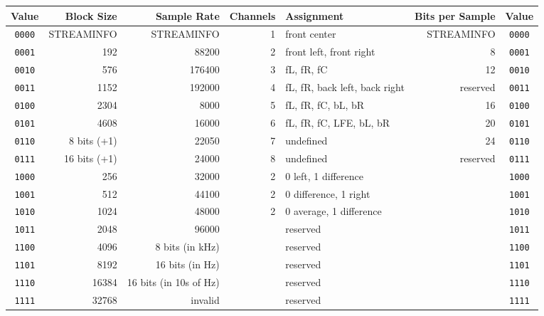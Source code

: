 \label{flac_encoded_fields}
\begin{figure}[h]
\begin{tiny}
\begin{tabular}{|c|r|r|r|l|r|c|}
\hline
Value & Block Size & Sample Rate & Channels & Assignment & Bits per Sample & Value \\
\hline
\texttt{0000} & STREAMINFO & STREAMINFO & 1 & front center & STREAMINFO & \texttt{0000} \\
\texttt{0001} & 192 & 88200 & 2 & front left, front right & 8 & \texttt{0001} \\
\texttt{0010} & 576 & 176400 & 3 & fL, fR, fC & 12 & \texttt{0010} \\
\texttt{0011} & 1152 & 192000 & 4 & fL, fR, back left, back right & reserved & \texttt{0011} \\
\texttt{0100} & 2304 & 8000 & 5 & fL, fR, fC, bL, bR & 16 & \texttt{0100} \\
\texttt{0101} & 4608 & 16000 & 6 & fL, fR, fC, LFE, bL, bR & 20 & \texttt{0101} \\
\texttt{0110} & 8 bits (+1) & 22050 & 7 & undefined & 24 & \texttt{0110} \\
\texttt{0111} & 16 bits (+1) & 24000 & 8 & undefined & reserved & \texttt{0111} \\
\texttt{1000} & 256 & 32000 & 2 & 0 left, 1 difference & & \texttt{1000} \\
\texttt{1001} & 512 & 44100 & 2 & 0 difference, 1 right & & \texttt{1001} \\
\texttt{1010} & 1024 & 48000 & 2 & 0 average, 1 difference & & \texttt{1010} \\
\texttt{1011} & 2048 & 96000 & & reserved & & \texttt{1011} \\
\texttt{1100} & 4096 & 8 bits (in kHz) & & reserved & & \texttt{1100} \\
\texttt{1101} & 8192 & 16 bits (in Hz) & & reserved & & \texttt{1101} \\
\texttt{1110} & 16384 & 16 bits (in 10s of Hz) & & reserved & & \texttt{1110} \\
\texttt{1111} & 32768 & invalid & & reserved & & \texttt{1111} \\
\hline
\end{tabular}
\end{tiny}
\end{figure}
\par
{}
